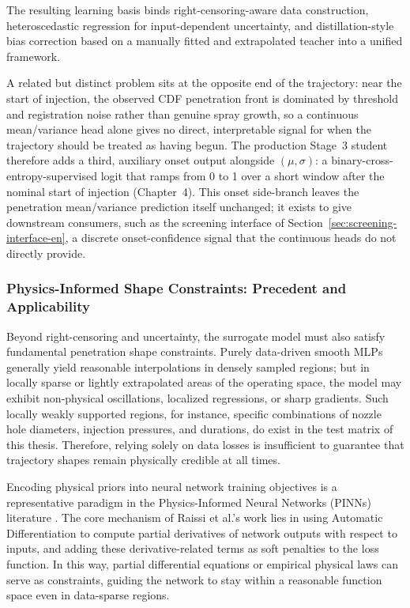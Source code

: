 The resulting learning basis binds right-censoring-aware data construction, heteroscedastic regression for input-dependent uncertainty, and distillation-style bias correction based on a manually fitted and extrapolated teacher into a unified framework.

A related but distinct problem sits at the opposite end of the trajectory: near the start of injection, the observed CDF penetration front is dominated by threshold and registration noise rather than genuine spray growth, so a continuous mean/variance head alone gives no direct, interpretable signal for when the trajectory should be treated as having begun. The production Stage~3 student therefore adds a third, auxiliary onset output alongside \((\mu,\sigma)\): a binary-cross-entropy-supervised logit that ramps from 0 to 1 over a short window after the nominal start of injection (Chapter~4). This onset side-branch leaves the penetration mean/variance prediction itself unchanged; it exists to give downstream consumers, such as the screening interface of Section~\ref{sec:screening-interface-en}, a discrete onset-confidence signal that the continuous heads do not directly provide.

\subsubsection{Physics-Informed Shape Constraints: Precedent and Applicability}

Beyond right-censoring and uncertainty, the surrogate model must also satisfy fundamental penetration shape constraints.
Purely data-driven smooth MLPs generally yield reasonable interpolations in densely sampled regions;
but in locally sparse or lightly extrapolated areas of the operating space, the model may exhibit non-physical oscillations, localized regressions, or sharp gradients.
Such locally weakly supported regions, for instance, specific combinations of nozzle hole diameters, injection pressures, and durations, do exist in the test matrix of this thesis.
Therefore, relying solely on data losses is insufficient to guarantee that trajectory shapes remain physically credible at all times.

Encoding physical priors into neural network training objectives is a representative paradigm in the Physics-Informed Neural Networks (PINNs) literature \cite{Raissi2019PINNs}.
The core mechanism of Raissi et al.'s work lies in using Automatic Differentiation to compute partial derivatives of network outputs with respect to inputs,
and adding these derivative-related terms as soft penalties to the loss function.
In this way, partial differential equations or empirical physical laws can serve as constraints, guiding the network to stay within a reasonable function space even in data-sparse regions.

